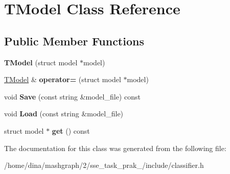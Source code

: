 \hypertarget{class_t_model}{\section{T\-Model Class Reference}
\label{class_t_model}
}
\subsection*{Public Member Functions}
\begin{DoxyCompactItemize}
\item 
\hypertarget{class_t_model_a446d867a95de8a6a1c2ca0a5e0917d5d}{{\bfseries T\-Model} (struct model $\ast$model)}\label{class_t_model_a446d867a95de8a6a1c2ca0a5e0917d5d}

\item 
\hypertarget{class_t_model_afffd43199cc849e49ac97a35da6c8b5f}{\hyperlink{class_t_model}{T\-Model} \& {\bfseries operator=} (struct model $\ast$model)}\label{class_t_model_afffd43199cc849e49ac97a35da6c8b5f}

\item 
\hypertarget{class_t_model_a7740a37694e104e621255819f2c21a16}{void {\bfseries Save} (const string \&model\-\_\-file) const }\label{class_t_model_a7740a37694e104e621255819f2c21a16}

\item 
\hypertarget{class_t_model_a462f20ff87cc239d0871e703dff3dec5}{void {\bfseries Load} (const string \&model\-\_\-file)}\label{class_t_model_a462f20ff87cc239d0871e703dff3dec5}

\item 
\hypertarget{class_t_model_ab3383f86b768021d1918d3de28b5e2fa}{struct model $\ast$ {\bfseries get} () const }\label{class_t_model_ab3383f86b768021d1918d3de28b5e2fa}

\end{DoxyCompactItemize}


The documentation for this class was generated from the following file\-:\begin{DoxyCompactItemize}
\item 
/home/dina/mashgraph/2/sse\-\_\-task\-\_\-prak\-\_/include/classifier.\-h\end{DoxyCompactItemize}
